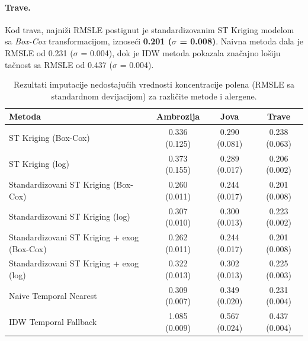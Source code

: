 \documentclass[12pt]{article}
\begin{document}
\paragraph{Trave.}
Kod trava, najniži RMSLE postignut je standardizovanim ST Kriging modelom sa \textit{Box-Cox} transformacijom, iznoseći \textbf{0.201 ($\sigma$ = 0.008)}. Naivna metoda dala je RMSLE od 0.231 ($\sigma$ = 0.004), dok je IDW metoda pokazala značajno lošiju tačnost sa RMSLE od 0.437 ($\sigma$ = 0.004).



\begin{table}[H]
\centering
\caption{Rezultati imputacije nedostajućih vrednosti koncentracije polena (RMSLE sa standardnom devijacijom) za različite metode i alergene.}

\label{tab:imputation_all_methods_std}
\renewcommand{\arraystretch}{1.3}
\begin{tabular}{|l|c|c|c|}
\hline
\textbf{Metoda} & \textbf{Ambrozija} & \textbf{Jova} & \textbf{Trave} \\
\hline
ST Kriging (Box-Cox) & 0.336 (0.125) & 0.290 (0.081) & 0.238 (0.063) \\
\hline
ST Kriging (log) & 0.373 (0.155) & 0.289 (0.017) & 0.206 (0.002) \\
\hline
Standardizovani ST Kriging (Box-Cox) & 0.260 (0.011) & 0.244 (0.017) & 0.201 (0.008) \\
\hline
Standardizovani ST Kriging (log) & 0.307 (0.010) & 0.300 (0.013) & 0.223 (0.002) \\
\hline
Standardizovani ST Kriging + exog (Box-Cox) & 0.262 (0.011) & 0.244 (0.017) & 0.201 (0.008) \\
\hline
Standardizovani ST Kriging + exog (log) & 0.322 (0.013) & 0.302 (0.013) & 0.225 (0.003) \\
\hline
Naive Temporal Nearest & 0.309 (0.007) & 0.349 (0.020) & 0.231 (0.004) \\
\hline
IDW Temporal Fallback & 1.085 (0.009) & 0.567 (0.024) & 0.437 (0.004) \\
\hline
\end{tabular}
\end{table}
\end{document}
